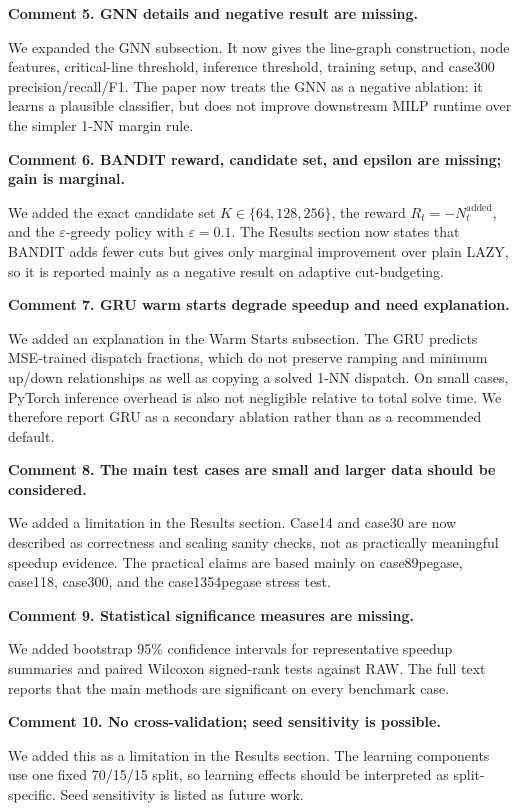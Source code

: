 \documentclass[11pt,a4paper]{article}
\begin{document}
\textbf{Comment 5. GNN details and negative result are missing.}

We expanded the GNN subsection. It now gives the line-graph construction, node features, critical-line threshold, inference threshold, training setup, and case300 precision/recall/F1. The paper now treats the GNN as a negative ablation: it learns a plausible classifier, but does not improve downstream MILP runtime over the simpler 1-NN margin rule.

\textbf{Comment 6. BANDIT reward, candidate set, and epsilon are missing; gain is marginal.}

We added the exact candidate set $K\in\{64,128,256\}$, the reward $R_t=-N_t^{\mathrm{added}}$, and the $\varepsilon$-greedy policy with $\varepsilon=0.1$. The Results section now states that BANDIT adds fewer cuts but gives only marginal improvement over plain LAZY, so it is reported mainly as a negative result on adaptive cut-budgeting.

\textbf{Comment 7. GRU warm starts degrade speedup and need explanation.}

We added an explanation in the Warm Starts subsection. The GRU predicts MSE-trained dispatch fractions, which do not preserve ramping and minimum up/down relationships as well as copying a solved 1-NN dispatch. On small cases, PyTorch inference overhead is also not negligible relative to total solve time. We therefore report GRU as a secondary ablation rather than as a recommended default.

\textbf{Comment 8. The main test cases are small and larger data should be considered.}

We added a limitation in the Results section. Case14 and case30 are now described as correctness and scaling sanity checks, not as practically meaningful speedup evidence. The practical claims are based mainly on case89pegase, case118, case300, and the case1354pegase stress test.

\textbf{Comment 9. Statistical significance measures are missing.}

We added bootstrap 95\% confidence intervals for representative speedup summaries and paired Wilcoxon signed-rank tests against RAW. The full text reports that the main methods are significant on every benchmark case.

\textbf{Comment 10. No cross-validation; seed sensitivity is possible.}

We added this as a limitation in the Results section. The learning components use one fixed 70/15/15 split, so learning effects should be interpreted as split-specific. Seed sensitivity is listed as future work.
\end{document}
